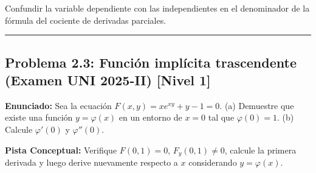 \documentclass[11pt,a4paper]{article}
\begin{document}
\begin{trapbox}
Confundir la variable dependiente con las independientes en el denominador de la fórmula del cociente de derivadas parciales.
\end{trapbox}

\vspace{0.5cm}
\hrule
\vspace{0.5cm}

\subsection*{Problema 2.3: Función implícita trascendente (Examen UNI 2025-II) \hfill \color{primaryblue}\small[Nivel 1]}

\begin{tcolorbox}[colback=white,colframe=gray!40,arc=1mm,boxrule=0.5pt,left=3mm,right=3mm,top=2mm,bottom=2mm]
\textbf{Enunciado:} Sea la ecuación $F(x,y) = x e^{xy} + y - 1 = 0$. (a) Demuestre que existe una función $y = \varphi(x)$ en un entorno de $x = 0$ tal que $\varphi(0) = 1$. (b) Calcule $\varphi'(0)$ y $\varphi''(0)$.
\end{tcolorbox}

\begin{tcolorbox}[colback=yellow!4,colframe=accentamber!70,arc=1mm,boxrule=0.5pt,left=3mm,right=3mm,top=1.5mm,bottom=1.5mm]
\textbf{Pista Conceptual:} Verifique $F(0,1) = 0$, $F_y(0,1) \neq 0$, calcule la primera derivada y luego derive nuevamente respecto a $x$ considerando $y = \varphi(x)$.
\end{tcolorbox}
\end{document}
